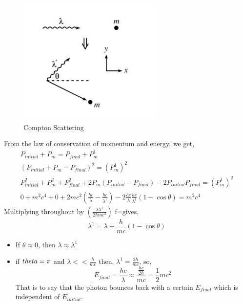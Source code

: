  \begin{figure}
    \centering
    \includegraphics{Figures/compton effect .png}
    \caption{Compton Scattering}
    \label{fig:my_label}
\end{figure}
From the law of conservation of momentum and energy,  we get, 
\begin{eqnarray}
P_{initial} + P_{m} = P_{final}+ P_{m}^{1} \\
(P_{initial} + P_{m}- P_{final})^{2}  = (P_{m}^{1})^{2} \\
P_{initial}^{2} + P_{m}^{2}+ P_{final}^{2} + 2 P_{m}(P_{initial} - P_{final} )- 2 P_{initial}P_{final} = (P_{m}^{1})^{2} \\
0+ m^{2}c^{4} + 0 + 2m c^{2}(\frac{hc}{\lambda} -\frac{hc}{\lambda^{1}}) - 2 \frac{hc}{\lambda} \frac{hc}{\lambda^{1}} (1-\cos{\theta}) = m^{2}c^{4}
\end{eqnarray}
Multiplying throughout by $(\frac{\lambda \lambda^{1}}{2hmc^{3}})$ f=gives, 
\begin{equation}
    \lambda^{1} = \lambda + \frac{h}{mc}(1- \cos{\theta})
\end{equation}
\begin{itemize}
    \item If $\theta \approx 0$, then $\lambda \approx \lambda^{1}$
    \item if $\\theta = \pi $ and $\lambda << \frac{h}{mc} $ then, $\lambda^{1}= \frac{2h}{mc}$, so, 
    \begin{equation}
    E_{final}=\frac{hc}{\lambda} \approx \frac{\frac{hc}{2h}}{mc} = \frac{1}{2}mc^{2}
    \end{equation}
    That is to say that the photon bounces back with a certain $E_{final}$ which is independent of $E_{initial}$. 
\end{itemize}



